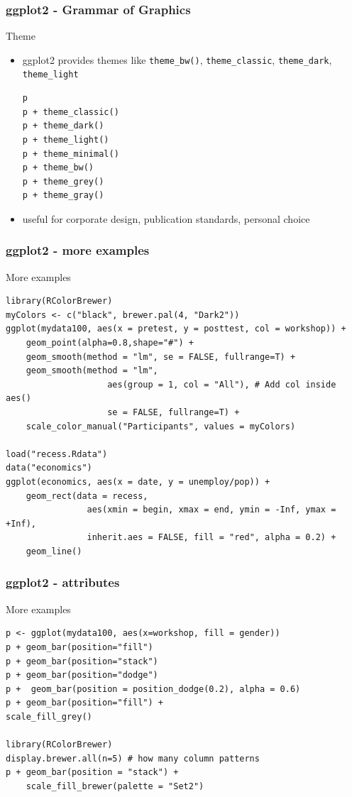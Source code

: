 \documentclass[xcolor={svgnames},10pt,
handout
]{beamer}
\begin{document}
\begin{frame}[fragile]\frametitle{ggplot2 - Grammar of Graphics}
Theme
\begin{itemize}
	\item ggplot2 provides themes like \lstinline|theme_bw()|, \lstinline|theme_classic|, \lstinline|theme_dark|, \lstinline|theme_light|
	\begin{lstlisting}
p
p + theme_classic()
p + theme_dark()
p + theme_light()
p + theme_minimal()
p + theme_bw()
p + theme_grey()
p + theme_gray()
	\end{lstlisting}
	\item useful for corporate design, publication standards, personal choice
\end{itemize}
\end{frame}



\begin{frame}[fragile]\frametitle{ggplot2 - more examples}
More examples
\begin{lstlisting}[basicstyle=\footnotesize]
library(RColorBrewer)
myColors <- c("black", brewer.pal(4, "Dark2"))
ggplot(mydata100, aes(x = pretest, y = posttest, col = workshop)) +
	geom_point(alpha=0.8,shape="#") +
	geom_smooth(method = "lm", se = FALSE, fullrange=T) +
	geom_smooth(method = "lm",
					aes(group = 1, col = "All"), # Add col inside aes()
					se = FALSE, fullrange=T) +
	scale_color_manual("Participants", values = myColors)

load("recess.Rdata")
data("economics")
ggplot(economics, aes(x = date, y = unemploy/pop)) +
	geom_rect(data = recess,
				aes(xmin = begin, xmax = end, ymin = -Inf, ymax = +Inf),
				inherit.aes = FALSE, fill = "red", alpha = 0.2) +
	geom_line()
\end{lstlisting}
\end{frame}


\begin{frame}[fragile]\frametitle{ggplot2 - attributes}
More examples
\begin{lstlisting}
p <- ggplot(mydata100, aes(x=workshop, fill = gender))
p + geom_bar(position="fill")
p + geom_bar(position="stack")
p + geom_bar(position="dodge")
p +  geom_bar(position = position_dodge(0.2), alpha = 0.6)
p + geom_bar(position="fill") +
scale_fill_grey()

library(RColorBrewer)
display.brewer.all(n=5) # how many column patterns
p + geom_bar(position = "stack") + 
	scale_fill_brewer(palette = "Set2")
\end{lstlisting}
\end{frame}
\end{document}
